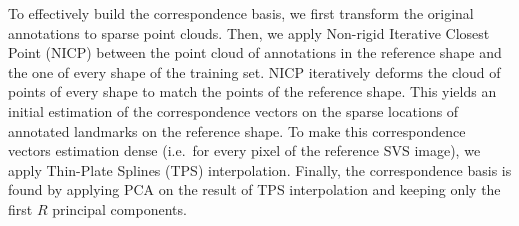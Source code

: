 To effectively build the correspondence basis, we first transform the original annotations to sparse point clouds. Then, we apply Non-rigid Iterative Closest Point (NICP)\cite{Amber2007} between the point cloud of annotations in the reference shape and the one of every shape of the training set. NICP iteratively deforms the cloud of points of every shape to match the points of the reference shape. This yields an initial estimation of the correspondence vectors on the sparse locations of annotated landmarks on the reference shape. To make this correspondence vectors estimation dense (i.e.~for every pixel of the reference SVS image), we apply Thin-Plate Splines (TPS)\cite{Bookstein1989} interpolation. Finally, the correspondence basis is found by applying PCA on the result of TPS interpolation and keeping only the first $R$ principal components.




%
%





